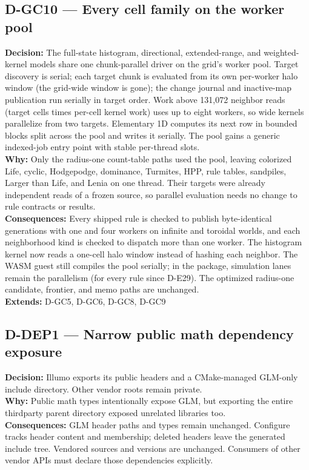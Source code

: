 \subsection*{D-GC10 --- Every cell family on the worker pool}
\begin{decisionbox}[title={D-GC10 \quad 2026-09-25}]
\textbf{Decision:} The full-state histogram, directional, extended-range, and
weighted-kernel models share one chunk-parallel driver on the grid's worker
pool. Target discovery is serial; each target chunk is evaluated from its own
per-worker halo window (the grid-wide window is gone); the change journal and
inactive-map publication run serially in target order. Work above 131,072
neighbor reads (target cells times per-cell kernel work) uses up to eight
workers, so wide kernels parallelize from two targets. Elementary 1D computes
its next row in bounded blocks split across the pool and writes it serially.
The pool gains a generic indexed-job entry point with stable per-thread slots.\\
\textbf{Why:} Only the radius-one count-table paths used the pool, leaving
colorized Life, cyclic, Hodgepodge, dominance, Turmites, HPP, rule tables,
sandpiles, Larger than Life, and Lenia on one thread. Their targets were already
independent reads of a frozen source, so parallel evaluation needs no change to
rule contracts or results.\\
\textbf{Consequences:} Every shipped rule is checked to publish byte-identical
generations with one and four workers on infinite and toroidal worlds, and each
neighborhood kind is checked to dispatch more than one worker. The histogram
kernel now reads a one-cell halo window instead of hashing each neighbor. The
WASM guest still compiles the pool serially; in the package, simulation lanes
remain the parallelism (for every rule since D-E29). The optimized
radius-one candidate, frontier, and memo paths are unchanged.\\
\textbf{Extends:} D-GC5, D-GC6, D-GC8, D-GC9
\end{decisionbox}

\subsection*{D-DEP1 --- Narrow public math dependency exposure}
\begin{decisionbox}[title={D-DEP1 \quad 2026-09-14}]
\textbf{Decision:} Illumo exports its public headers and a CMake-managed GLM-only
include directory. Other vendor roots remain private.\\
\textbf{Why:} Public math types intentionally expose GLM, but exporting the
entire thirdparty parent directory exposed unrelated libraries too.\\
\textbf{Consequences:} GLM header paths and types remain unchanged. Configure
tracks header content and membership; deleted headers leave the generated
include tree. Vendored sources and versions are unchanged. Consumers of other
vendor APIs must declare those dependencies explicitly.
\end{decisionbox}

